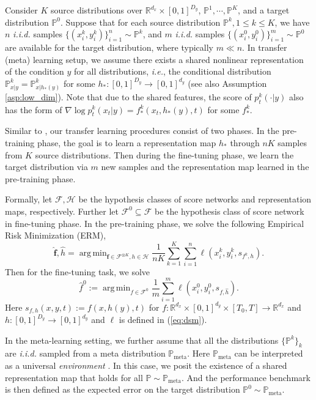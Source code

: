 \documentclass{article}
\numberwithin{equation}{section}
\def\eqref#1{equation~\ref{#1}}
\def\vf{{\bm{f}}}
\newcommand{\R}{\mathbb{R}}
\DeclareMathOperator*{\argmin}{arg\,min}
\theoremstyle{definition}
\newcommand{\Pmeta}{\mathbb{P}_{\text{meta}}}
\renewcommand{\P}{\mathbb{P}}
\renewcommand{\eqref}[1]{(\ref{#1})}
\begin{document}
Consider $K$ source distributions over $\R^{d_x}\times[0,1]^{D_y}$, $\P^{1},\cdots,\P^K$, and a target distribution $\P^{0}$.
Suppose that for each source distribution $\P^k,1\leq k\leq K$, we have $n$ \textit{i.i.d.} samples $\{(x_i^k,y_i^k)\}_{i=1}^n\sim\P^k$, and $m$ \textit{i.i.d.} samples $\{(x_i^0,y_i^0)\}_{i=1}^m\sim\P^0$ are available for the target distribution, where typically $m\ll n$.
In transfer (meta) learning setup, we assume there exists a shared nonlinear representation of the condition $y$ for all distributions, \textit{i.e.}, the conditional distribution $\P^k_{x|y}=\P^k_{x|h_*(y)}$ for some $h_*:[0,1]^{D_y}\to[0,1]^{d_y}$ (see also Assumption \ref{asp:low_dim}).
Note that due to the shared features, the score of $p_t^{k}(\cdot|y)$ also has the form of $\nabla\log p_t^{k}(x_t|y)=f_*^{k}(x_t, h_*(y), t)$ for some $f_*^{k}$.

Similar to \citet{tripuraneni2020theory}, our transfer learning procedures consist of two phases.
In the pre-training phase, the goal is to learn a representation map $h_*$ through $nK$ samples from $K$ source distributions.
Then during the fine-tuning phase, we learn the target distribution via $m$ new samples and the representation map learned in the pre-training phase.

Formally, let $\mathcal{F},\mathcal{H}$ be the hypothesis classes of score networks and representation maps, respectively.
Further let $\mathcal{F}^0\subseteq\mathcal{F}$ be the hypothesis class of score network in fine-tuning phase.
In the pre-training phase, we solve the following Empirical Risk Minimization (ERM),
\begin{equation}\label{eq:pre-train}
    \widehat{\vf},\widehat{h}=\argmin_{\vf\in\mathcal{F}^{\otimes K},h\in\mathcal{H}} \frac{1}{nK}\sum_{k=1}^K\sum_{i=1}^n\ell(x_i^k,y_i^k,s_{f^k,h}).
\end{equation}
Then for the fine-tuning task, we solve
\begin{equation}\label{eq:fine-tune}
    \widehat{f}^0:= \argmin_{f\in\mathcal{F}^0} \frac{1}{m}\sum_{i=1}^m \ell(x_i^0,y_i^0,s_{f,\widehat{h}}).
\end{equation}
Here $s_{f,h}(x,y,t):=f(x,h(y),t)$ for $f:\R^{d_x}\times[0,1]^{d_y}\times[T_0,T]\to\R^{d_x}$ and $h:[0,1]^{D_y}\to[0,1]^{d_y}$ and $\ell$ is defined in \eqref{eq:dsm}.

In the meta-learning setting, we further assume that all the distributions $\{\P^k\}_k$ are \textit{i.i.d.} sampled from a meta distribution $\Pmeta$. 
Here $\Pmeta$ can be interpreted as a universal \textit{environment} \citep{baxter2000model,maurer2016benefit}.
In this case, we posit the existence of a shared representation map that holds for all $\P\sim\Pmeta$.
And the performance benchmark is then defined as the expected error on the target distribution $\P^0\sim\Pmeta$.
\end{document}
